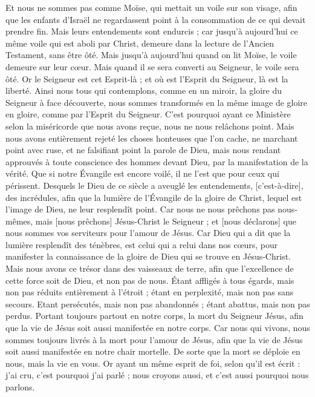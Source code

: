 \begin{multicols}{2}
Et nous ne sommes pas comme Moïse, qui mettait un voile sur son visage, afin que les enfants d'Israël ne regardassent point à la consommation de ce qui devait prendre fin.
Mais leurs entendements sont endurcis ; car jusqu'à aujourd'hui ce même voile qui est aboli par Christ, demeure dans la lecture de l'Ancien Testament, sans être ôté.
Mais jusqu'à aujourd'hui quand on lit Moïse, le voile demeure sur leur cœur.
Mais quand il se sera converti au Seigneur, le voile sera ôté.
Or le Seigneur est cet Esprit-là ; et où est l'Esprit du Seigneur, là est la liberté.
Ainsi nous tous qui contemplons, comme en un miroir, la gloire du Seigneur à face découverte, nous sommes transformés en la même image de gloire en gloire, comme par l'Esprit du Seigneur.
\VerseOne{}C'est pourquoi ayant ce Ministère selon la miséricorde que nous avons reçue, nous ne nous relâchons point.
Mais nous avons entièrement rejeté les choses honteuses que l'on cache, ne marchant point avec ruse, et ne falsifiant point la parole de Dieu, mais nous rendant approuvés à toute conscience des hommes devant Dieu, par la manifestation de la vérité.
Que si notre Évangile est encore voilé, il ne l'est que pour ceux qui périssent.
Desquels le Dieu de ce siècle a aveuglé les entendements, [c'est-à-dire], des incrédules, afin que la lumière de l'Évangile de la gloire de Christ, lequel est l'image de Dieu, ne leur resplendît point.
Car nous ne nous prêchons pas nous-mêmes, mais [nous prêchons] Jésus-Christ le Seigneur ; et [nous déclarons] que nous sommes vos serviteurs pour l'amour de Jésus.
Car Dieu qui a dit que la lumière resplendît des ténèbres, est celui qui a relui dans nos cœurs, pour manifester la connaissance de la gloire de Dieu qui se trouve en Jésus-Christ.
Mais nous avons ce trésor dans des vaisseaux de terre, afin que l'excellence de cette force soit de Dieu, et non pas de nous.
Étant affligés à tous égards, mais non pas réduits entièrement à l'étroit ; étant en perplexité, mais non pas sans secours.
Etant persécutés, mais non pas abandonnés ; étant abattus, mais non pas perdus.
Portant toujours partout en notre corps, la mort du Seigneur Jésus, afin que la vie de Jésus soit aussi manifestée en notre corps.
Car nous qui vivons, nous sommes toujours livrés à la mort pour l'amour de Jésus, afin que la vie de Jésus soit aussi manifestée en notre chair mortelle.
De sorte que la mort se déploie en nous, mais la vie en vous.
Or ayant un même esprit de foi, selon qu'il est écrit : j'ai cru, c'est pourquoi j'ai parlé ; nous croyons aussi, et c'est aussi pourquoi nous parlons.

\end{multicols}
